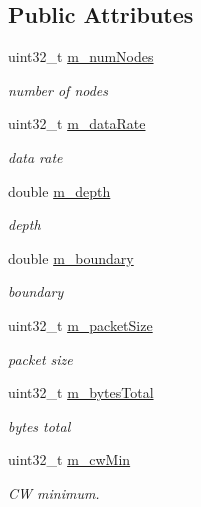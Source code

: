 \subsection*{Public Attributes}
\begin{DoxyCompactItemize}
\item 
uint32\+\_\+t \hyperlink{classNetAnimExperiment_a829363fc981b850401bc71674534c447}{m\+\_\+num\+Nodes}
\begin{DoxyCompactList}\small\item\em number of nodes \end{DoxyCompactList}\item 
uint32\+\_\+t \hyperlink{classNetAnimExperiment_a7998af435f1259ef914a8e434f76a0c0}{m\+\_\+data\+Rate}
\begin{DoxyCompactList}\small\item\em data rate \end{DoxyCompactList}\item 
double \hyperlink{classNetAnimExperiment_a6b6f1fbd47ec60dd032ae97f8962dea1}{m\+\_\+depth}
\begin{DoxyCompactList}\small\item\em depth \end{DoxyCompactList}\item 
double \hyperlink{classNetAnimExperiment_a172cb08bfa569ac31ad597a6770a467d}{m\+\_\+boundary}
\begin{DoxyCompactList}\small\item\em boundary \end{DoxyCompactList}\item 
uint32\+\_\+t \hyperlink{classNetAnimExperiment_a8fa7c7d678fb0721374708aad5537510}{m\+\_\+packet\+Size}
\begin{DoxyCompactList}\small\item\em packet size \end{DoxyCompactList}\item 
uint32\+\_\+t \hyperlink{classNetAnimExperiment_ac826fc02c4742d11f53af43c6bca0feb}{m\+\_\+bytes\+Total}
\begin{DoxyCompactList}\small\item\em bytes total \end{DoxyCompactList}\item 
uint32\+\_\+t \hyperlink{classNetAnimExperiment_a2d4b4380bbc3962d37415236ebc46f64}{m\+\_\+cw\+Min}
\begin{DoxyCompactList}\small\item\em CW minimum. \end{DoxyCompactList}\item 

\end{DoxyCompactItemize}
